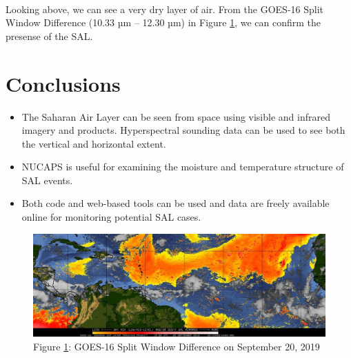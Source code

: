 \documentclass[11pt]{article}
\makeatletter
\def\maxwidth{\ifdim\Gin@nat@width>\linewidth\linewidth
    \else\Gin@nat@width\fi}
\let\Oldincludegraphics\includegraphics
\renewcommand{\includegraphics}[1]{\Oldincludegraphics[width=.8\maxwidth]{#1}}
\providecommand{\tightlist}{%
      \setlength{\itemsep}{0pt}\setlength{\parskip}{0pt}}
\makeatother
\begin{document}
    \begin{center}
    \end{center}
    { \hspace*{\fill} \\}

    Looking above, we can see a very dry layer of air. From the GOES-16
Split Window Difference (10.33 µm -- 12.30 µm) in Figure \ref{fig:split}, we can confirm the
presense of the SAL.

\section{Conclusions}\label{conclusions}

\begin{itemize}
  \tightlist
  \item
    The Saharan Air Layer can be seen from space using visible and infrared imagery and products. Hyperspectral sounding data can be used to see both the vertical and horizontal extent.
  \item
    NUCAPS is useful for examining the moisture and temperature structure of SAL events.
  \item
    Both code and web-based tools can be used and data are freely
    available online for monitoring potential SAL cases.
  \end{itemize}

\begin{figure}[h]
\centering
\includegraphics{images/20180920.15.NWAtlantic.SALgoes16split.png}
\caption{Figure \ref{fig:split}: GOES-16 Split Window Difference on September 20, 2019}
\label{fig:split}
\end{figure}
\end{document}
